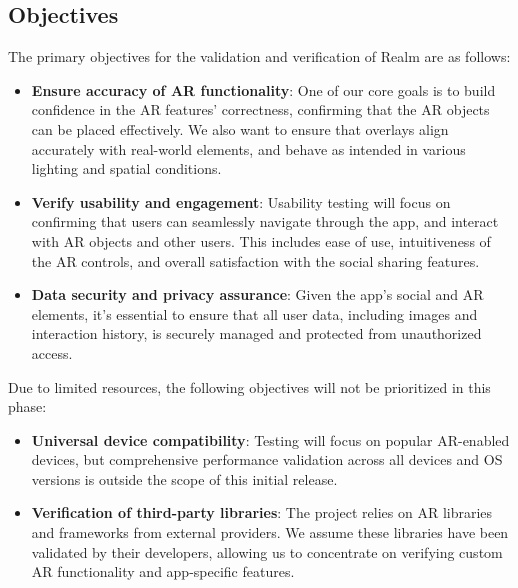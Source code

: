 \documentclass[12pt, titlepage]{article}
\begin{document}
\subsection{Objectives}

The primary objectives for the validation and verification of Realm are as follows: \\

\begin{itemize}
    \item \textbf{Ensure accuracy of AR functionality}: One of our core goals is to build confidence in the AR features' correctness, confirming that the AR objects can be placed effectively. We also want to ensure that overlays align accurately with real-world elements, and behave as intended in various lighting and spatial conditions. \\

    \item \textbf{Verify usability and engagement}: Usability testing will focus on confirming that users can seamlessly navigate through the app, and interact with AR objects and other users. This includes ease of use, intuitiveness of the AR controls, and overall satisfaction with the social sharing features. \\

    \item \textbf{Data security and privacy assurance}: Given the app's social and AR elements, it's essential to ensure that all user data, including images and interaction history, is securely managed and protected from unauthorized access. \\
\end{itemize}

Due to limited resources, the following objectives will not be prioritized in this phase: \\

\begin{itemize}
    \item \textbf{Universal device compatibility}: Testing will focus on popular AR-enabled devices, but comprehensive performance validation across all devices and OS versions is outside the scope of this initial release. \\

    \item \textbf{Verification of third-party libraries}: The project relies on AR libraries and frameworks from external providers. We assume these libraries have been validated by their developers, allowing us to concentrate on verifying custom AR functionality and app-specific features. \\
\end{itemize}
\end{document}
